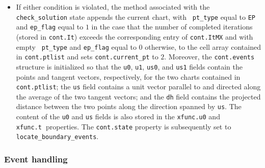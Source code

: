 \documentclass{article}
\begin{document}
\begin{itemize}
\item If either condition is violated, the method associated with the 
\texttt{check\_solution} state appends the current chart, with \texttt{%
pt\_type} equal to \texttt{EP} and \texttt{ep\_flag} equal to $1$ in the
case that the number of completed iterations (stored in \texttt{cont.It})
exceeds the corresponding entry of \texttt{cont.ItMX} and with empty \texttt{%
pt\_type} and \texttt{ep\_flag} equal to $0$ otherwise, to the cell array
contained in \texttt{cont.ptlist} and sets \texttt{cont.current\_pt} to $2$.
Moreover, the \texttt{cont.events} structure is initialized so that the 
\texttt{u0}, \texttt{u1}, \texttt{us0}, and \texttt{us1} fields contain the
points and tangent vectors, respectively, for the two charts contained in 
\texttt{cont.ptlist}; the \texttt{us} field contains a unit vector parallel
to and directed along the average of the two tangent vectors; and the 
\texttt{dh} field contains the projected distance between the two points
along the direction spanned by \texttt{us}. The content of the \texttt{u0}
and \texttt{us} fields is also stored in the \texttt{xfunc.u0} and \texttt{%
xfunc.t}\textbf{\ }properties. The \texttt{cont.state} property is
subsequently set to \texttt{locate\_boundary\_events}.
\end{itemize}

\subsubsection{Event handling}
\end{document}

